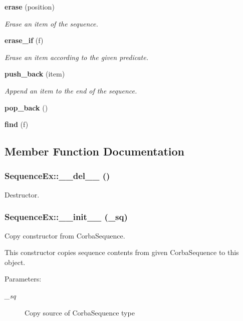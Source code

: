 \begin{CompactItemize}
{\bf erase} (position)
\begin{CompactList}\small\item\em Erase an item of the sequence. \item\end{CompactList}\item 
{\bf erase\_\-if} (f)
\begin{CompactList}\small\item\em Erase an item according to the given predicate. \item\end{CompactList}\item 
{\bf push\_\-back} (item)
\begin{CompactList}\small\item\em Append an item to the end of the sequence. \item\end{CompactList}\item 
{\bf pop\_\-back} ()
\item 
{\bf find} (f)
\end{CompactItemize}


\subsection{Member Function Documentation}
\subsubsection{\setlength{\rightskip}{0pt plus 5cm}Sequence\-Ex::\_\-\_\-del\_\-\_\- ()}\label{classSequenceEx_SequenceExa1}


Destructor. 

\subsubsection{\setlength{\rightskip}{0pt plus 5cm}Sequence\-Ex::\_\-\_\-init\_\-\_\- (\_\-sq)}\label{classSequenceEx_SequenceExa0}


Copy constructor from Corba\-Sequence. 

This constructor copies sequence contents from given Corba\-Sequence to this object.

\begin{Desc}
\item[Parameters:]
\begin{description}
\item[{\em \_\-sq}]Copy source of Corba\-Sequence type\end{description}
\end{Desc}
